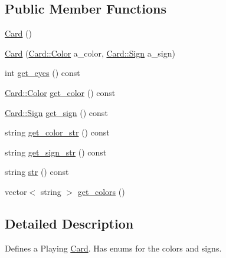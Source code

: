 \subsection*{Public Member Functions}
\begin{DoxyCompactItemize}
\item 
\hyperlink{classCard_a783f5854cbe8c183ee3d4414c01472c0}{Card} ()
\item 
\hyperlink{classCard_a4befb954ff24941abf7a8182bab5c466}{Card} (\hyperlink{classCard_ad5805e73a4727fb7d3c76f3085b05fbe}{Card\-::\-Color} a\-\_\-color, \hyperlink{classCard_a1e4976f4ceae49d4ed0bdd15ee9d967a}{Card\-::\-Sign} a\-\_\-sign)
\item 
int \hyperlink{classCard_ad0b543693ca8efb081991d8ff158e03c}{get\-\_\-eyes} () const 
\item 
\hyperlink{classCard_ad5805e73a4727fb7d3c76f3085b05fbe}{Card\-::\-Color} \hyperlink{classCard_a28665bfdef737b483fea9958f90cc98f}{get\-\_\-color} () const 
\item 
\hyperlink{classCard_a1e4976f4ceae49d4ed0bdd15ee9d967a}{Card\-::\-Sign} \hyperlink{classCard_af6ec0393e46445480f0541cfcbb91c14}{get\-\_\-sign} () const 
\item 
string \hyperlink{classCard_aae1aa8c8e70157ff73195b3f4a7f091a}{get\-\_\-color\-\_\-str} () const 
\item 
string \hyperlink{classCard_aed191d28b9167b1116d6cdc71a404766}{get\-\_\-sign\-\_\-str} () const 
\item 
string \hyperlink{classCard_a858e6285c3610a404aa306b4e8f14d46}{str} () const 
\item 
vector$<$ string $>$ \hyperlink{classCard_aa59a4d61458741156aceaf0e0f1a48db}{get\-\_\-colors} ()
\end{DoxyCompactItemize}


\subsection{Detailed Description}
Defines a Playing \hyperlink{classCard}{Card}. Has enums for the colors and signs. 

